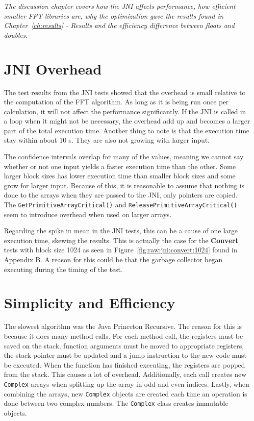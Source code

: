 \textit{The discussion chapter covers how the JNI affects performance, how efficient smaller FFT libraries are, why the optimization gave the results found in Chapter~\ref{ch:results} - Results and the efficiency difference between floats and doubles.}

\section{JNI Overhead}
The test results from the JNI tests showed that the overhead is small relative to the computation of the FFT algorithm. As long as it is being run once per calculation, it will not affect the performance significantly. If the JNI is called in a loop when it might not be necessary, the overhead add up and becomes a larger part of the total execution time. Another thing to note is that the execution time stay within about 10 \textmu s. They are also not growing with larger input.

The confidence intervals overlap for many of the values, meaning we cannot say whether or not one input yields a faster execution time than the other. Some larger block sizes has lower execution time than smaller block sizes and some grow for larger input. Because of this, it is reasonable to assume that nothing is done to the arrays when they are passed to the JNI, only pointers are copied. The \texttt{GetPrimitiveArrayCritical()} and \texttt{ReleasePrimitiveArrayCritical()} seem to introduce overhead when used on larger arrays. %

Regarding the spike in mean in the JNI tests, this can be a cause of one large execution time, skewing the results. This is actually the case for the \textbf{Convert} tests with block size 1024 as seen in Figure~\ref{fig:raw:jni:convert:1024} found in Appendix B. A reason for this could be that the garbage collector began executing during the timing of the test.

\section{Simplicity and Efficiency}

The slowest algorithm was the Java Princeton Recursive. The reason for this is because it does many method calls. For each method call, the registers must be saved on the stack, function arguments must be moved to appropriate registers, the stack pointer must be updated and a jump instruction to the new code must be executed. When the function has finished executing, the registers are popped from the stack. This causes a lot of overhead. Additionally, each call creates new \texttt{Complex} arrays when splitting up the array in odd and even indices. Lastly, when combining the arrays, new \texttt{Complex} objects are created each time an operation is done between two complex numbers. The \texttt{Complex} class creates immutable objects.


